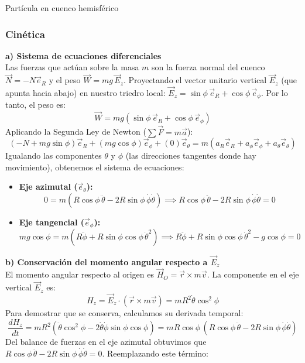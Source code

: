 \begin{solucion}{Partícula en cuenco hemisférico}
\subsubsection*{Cinética}
\textbf{a) Sistema de ecuaciones diferenciales}\\
Las fuerzas que actúan sobre la masa $m$ son la fuerza normal del cuenco $\vec{N} = -N \vec{e}_R$ y el peso $\vec{W} = mg\, \vec{E}_z$. Proyectando el vector unitario vertical $\vec{E}_z$ (que apunta hacia abajo) en nuestro triedro local: $\vec{E}_z = \sin\phi\, \vec{e}_R + \cos\phi\, \vec{e}_\phi$. Por lo tanto, el peso es:
$$\vec{W} = mg(\sin\phi\, \vec{e}_R + \cos\phi\, \vec{e}_\phi)$$
Aplicando la Segunda Ley de Newton ($\sum \vec{F} = m\vec{a}$):
$$(-N + mg\sin\phi)\vec{e}_R + (mg\cos\phi)\vec{e}_\phi + (0)\vec{e}_\theta = m(a_R\vec{e}_R + a_\phi\vec{e}_\phi + a_\theta\vec{e}_\theta)$$
Igualando las componentes $\theta$ y $\phi$ (las direcciones tangentes donde hay movimiento), obtenemos el sistema de ecuaciones:
\begin{itemize}
    \item \textbf{Eje azimutal ($\vec{e}_\theta$):}
    $$0 = m(R\cos\phi\,\ddot{\theta} - 2R\sin\phi\,\dot{\phi}\dot{\theta}) \implies R\cos\phi\,\ddot{\theta} - 2R\sin\phi\,\dot{\phi}\dot{\theta} = 0$$
    \item \textbf{Eje tangencial ($\vec{e}_\phi$):}
    $$mg\cos\phi = m(R\ddot{\phi} + R\sin\phi\cos\phi\,\dot{\theta}^2) \implies R\ddot{\phi} + R\sin\phi\cos\phi\,\dot{\theta}^2 - g\cos\phi = 0$$
\end{itemize}

\textbf{b) Conservación del momento angular respecto a $\vec{E}_z$}\\
El momento angular respecto al origen es $\vec{H}_O = \vec{r} \times m\vec{v}$. La componente en el eje vertical $\vec{E}_z$ es:
$$H_z = \vec{E}_z \cdot (\vec{r} \times m\vec{v}) = m R^2 \dot{\theta} \cos^2\phi$$
Para demostrar que se conserva, calculamos su derivada temporal:
$$\frac{d H_z}{dt} = m R^2 (\ddot{\theta}\cos^2\phi - 2\dot{\theta}\dot{\phi}\sin\phi\cos\phi) = m R\cos\phi\, (R\cos\phi\,\ddot{\theta} - 2R\sin\phi\,\dot{\phi}\dot{\theta})$$
Del balance de fuerzas en el eje azimutal obtuvimos que $R\cos\phi\,\ddot{\theta} - 2R\sin\phi\,\dot{\phi}\dot{\theta} = 0$. Reemplazando este término:

\end{solucion}
